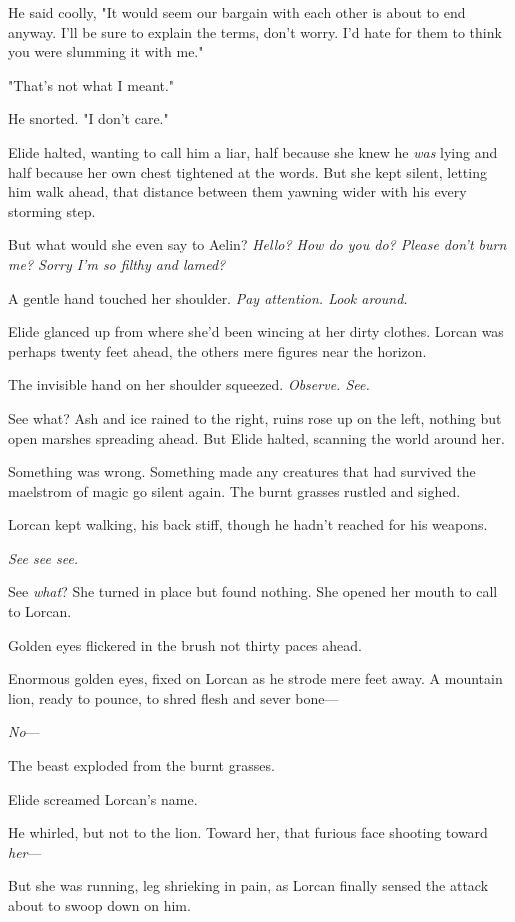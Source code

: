 He said coolly, "It would seem our bargain with each other is about to end anyway. I'll be sure to explain the terms, don't worry. I'd hate for them to think you were slumming it with me."

"That's not what I meant."

He snorted. "I don't care."

Elide halted, wanting to call him a liar, half because she knew he
\emph{was} lying and half because her own chest tightened at the words. But she kept silent, letting him walk ahead, that distance between them yawning wider with his every storming step.

But what would she even say to Aelin? \emph{Hello? How do you do? Please don't burn me? Sorry I'm so filthy and lamed?}

A gentle hand touched her shoulder. \emph{Pay attention. Look around.}

Elide glanced up from where she'd been wincing at her dirty clothes. Lorcan was perhaps twenty feet ahead, the others mere figures near the horizon.

The invisible hand on her shoulder squeezed. \emph{Observe. See.}

See what? Ash and ice rained to the right, ruins rose up on the left, nothing but open marshes spreading ahead. But Elide halted, scanning the world around her.

Something was wrong. Something made any creatures that had survived the maelstrom of magic go silent again. The burnt grasses rustled and sighed.

Lorcan kept walking, his back stiff, though he hadn't reached for his weapons.

\emph{See see see.}

See \emph{what}? She turned in place but found nothing. She opened her mouth to call to Lorcan.

Golden eyes flickered in the brush not thirty paces ahead.

Enormous golden eyes, fixed on Lorcan as he strode mere feet away. A mountain lion, ready to pounce, to shred flesh and sever bone---

\emph{No}---

The beast exploded from the burnt grasses.

Elide screamed Lorcan's name.

He whirled, but not to the lion. Toward her, that furious face shooting toward \emph{her}---

But she was running, leg shrieking in pain, as Lorcan finally sensed the attack about to swoop down on him.

